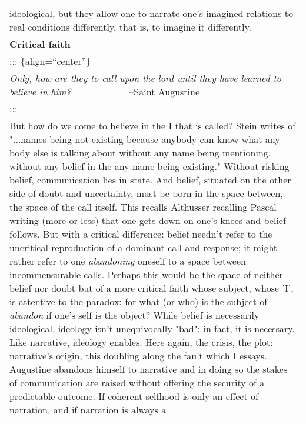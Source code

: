 \begin{longtable}[]{@{}l@{}}
\begin{minipage}[t]{0.97\columnwidth}
ideological, but they allow one to narrate one's imagined relations to
real conditions differently, that is, to imagine it differently.\strut
\end{minipage}\tabularnewline
\begin{minipage}[t]{0.97\columnwidth}\raggedright
\textbf{Critical faith}\strut
\end{minipage}\tabularnewline
\begin{minipage}[t]{0.97\columnwidth}\raggedright
::: \{align=``center''\}\strut
\end{minipage}\tabularnewline
\begin{minipage}[t]{0.97\columnwidth}\raggedright
\textbar{} \emph{Only, how are they to call upon the lord until they
have learned to \textbar{} believe in him?} \textbar{} \textbar{}
~~~~~~~~~~ ~--Saint Augustine\strut
\end{minipage}\tabularnewline
\begin{minipage}[t]{0.97\columnwidth}\raggedright
:::\strut
\end{minipage}\tabularnewline
\begin{minipage}[t]{0.97\columnwidth}\raggedright
But how do we come to believe in the I that is called? Stein writes of
"...names being not existing because anybody can know what any body else
is talking about without any name being mentioning, without any belief
in the any name being existing." Without risking belief, communication
lies in state. And belief, situated on the other side of doubt and
uncertainty, must be born in the space between, the space of the call
itself. This recalls Althusser recalling Pascal writing (more or less)
that one gets down on one's knees and belief follows. But with a
critical difference: belief needn't refer to the uncritical reproduction
of a dominant call and response; it might rather refer to one
\emph{abandoning} oneself to a space between incommensurable calls.
Perhaps this would be the space of neither belief nor doubt but of a
more critical faith whose subject, whose 'I', is attentive to the
paradox: for what (or who) is the subject of \emph{abandon} if one's
self is the object? While belief is necessarily ideological, ideology
isn't unequivocally "bad": in fact, it is necessary. Like narrative,
ideology enables. Here again, the crisis, the plot: narrative's origin,
this doubling along the fault which I essays. Augustine abandons himself
to narrative and in doing so the stakes of communication are raised
without offering the security of a predictable outcome. If coherent
selfhood is only an effect of narration, and if narration is always a

\end{minipage}
\end{longtable}
